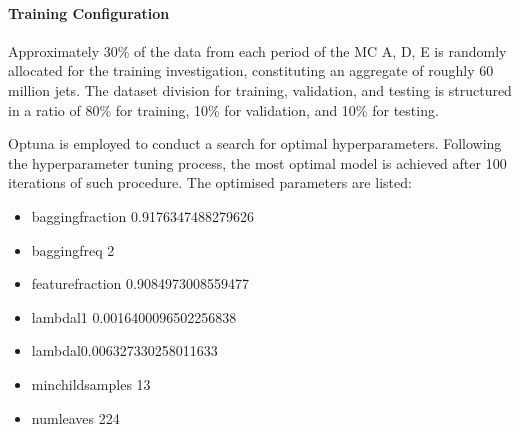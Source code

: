 
\paragraph{Training Configuration}\mbox{}\par

Approximately 30\% of the data from each period of the MC  A, D, E is randomly allocated for the training investigation, constituting an aggregate of roughly 60 million jets. 
The dataset division for training, validation, and testing is structured in a ratio of 80\% for training, 10\% for validation, and 10\% for testing.

Optuna is employed to conduct a search for optimal hyperparameters. Following the hyperparameter tuning process, the most optimal model is achieved after 100 iterations of such procedure. The optimised parameters are listed:

\begin{itemize}
	\item bagging\textunderscore fraction 0.9176347488279626
	\item bagging\textunderscore freq 2
	\item feature\textunderscore fraction 0.9084973008559477
	\item lambda\textunderscore l1 0.0016400096502256838
	\item lambda\textunderscore l0.006327330258011633
	\item min\textunderscore child\textunderscore samples 13
	\item num\textunderscore leaves 224
\end{itemize}

